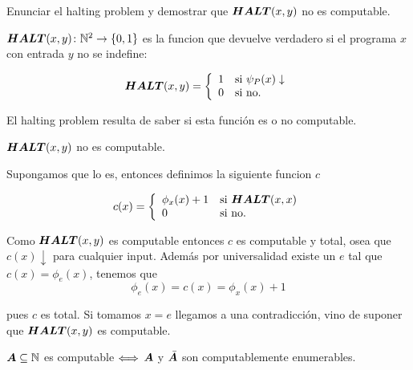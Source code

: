 \documentclass[leqno, 12pt, twoside,letterpaper]{book}
\begin{document}
\begin{ej}{3}
    Enunciar el halting problem y demostrar que $\bm{HALT}(x, y)$ no es computable.
\end{ej}

\begin{solucion}
\noindent $\bm{HALT}(x, y) \colon \mathbb{N}^2 \to \{0, 1\} $ es la funcion que devuelve verdadero si el programa $x$ con entrada $y$ no se indefine:

	\[ \bm{HALT}(x, y) = \left\{ \begin{array}{ll} 1 & \mbox{si } \psi_{P}(x) \downarrow \\ 0 & \mbox{} \mbox{si no.} \end{array} \right.\]

\noindent El halting problem resulta de saber si esta función es o no computable. \\

\begin{teo}{} $\bm{HALT}(x, y)$ no es computable.
\end{teo}

\begin{dem}
	Supongamos que lo es, entonces definimos la siguiente funcion $c$

	\[ c(x) = \left\{ \begin{array}{ll} \phi_x{(x)} + 1 & \mbox{si } \bm{HALT}(x, x) \\ 0 & \mbox{} \mbox{si no.} \end{array} \right. \]

	\noindent Como $\bm{HALT}(x, y)$ es computable entonces $c$ es computable y total, osea que $c(x) \downarrow$ para cualquier input. Además por universalidad existe un $e$ tal que $c(x) = \phi_{e}(x)$, tenemos que
	\[ \phi_{e}(x) = c(x) = \phi_{x}(x) + 1 \]

	\noindent pues $c$ es total. Si tomamos $x = e$ llegamos a una contradicción, vino de suponer que $\bm{HALT}(x, y)$ es computable.
\end{dem}
\end{solucion}

\begin{ej}{2}
    $\bm{A} \subseteq \mathbb{N}$ es computable $\Longleftrightarrow$ $\bm{A}$ y $\bar{\bm{A}}$ son
    computablemente enumerables.
\end{ej}
\end{document}
